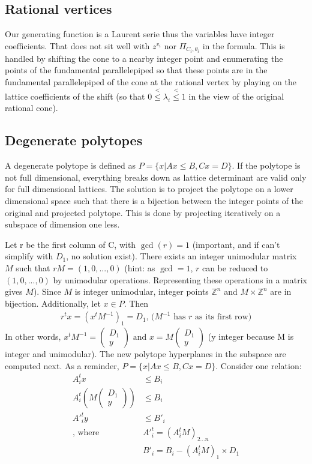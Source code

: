 \documentclass[14pt]{article}
\newcommand{\Z}{\mathbb{Z}}
\newcommand{\ltorle}{\overset{\scriptscriptstyle{<}}{\scriptscriptstyle{\le}}}
\begin{document}
\subsection*{Rational vertices}
Our generating function is a Laurent serie thus the variables have integer coefficients. That does not sit well with $z^{v_i}$ nor $\Pi_{C_i,\theta_i}$ in the formula.
This is handled by shifting the cone to a nearby integer point and enumerating the points of the fundamental parallelepiped so that these points are in the fundamental parallelepiped of the cone at the rational vertex by playing on the lattice coefficients of the shift (so that $0\ltorle \lambda_i \ltorle1$ in the view of the original rational cone).


\subsection*{Degenerate polytopes}

A degenerate polytope is defined as $P = \{x | Ax \le B, Cx = D\}$. If the polytope is not full dimensional, everything breaks down as lattice determinant are valid only for full dimensional lattices.
The solution is to project the polytope on a lower dimensional space such that there is a bijection between the integer points of the original and projected polytope.
This is done by projecting iteratively on a subspace of dimension one less.

Let r be the first column of C, with $\gcd(r) = 1$ (important, and if can't simplify with $D_1$, no solution exist). There exists an integer unimodular matrix $M$ such that $rM = (1,0,...,0)$ (hint: as $\gcd = 1$, $r$ can be reduced to $(1,0,...,0)$ by unimodular operations. Representing these operations in a matrix gives $M$).
Since $M$ is integer unimodular, integer points $\Z^n$ and $M \times \Z^n$ are in bijection. Additionally, let $x \in P$.
Then 
\begin{align*}
  r^t x = (x^t M^{-1})_1 = D_1 \text{, ($M^{-1}$ has $r$ as its first row)}
\end{align*}
In other words, $x^t M^{-1} = \begin{pmatrix}D_1 \\  y\end{pmatrix}\text{ and }x = M \begin{pmatrix}D_1 \\  y\end{pmatrix}$ (y integer because M is integer and unimodular).
The new polytope hyperplanes in the subspace are computed next. As a reminder, $P = \{x | Ax \le B, Cx = D\}$.
Consider one relation: 
\begin{align*}
  A_i^t x & \le B_i  \\
  A_i^t \left(M \begin{pmatrix}D_1 \\ y\end{pmatrix}\right) &\le B_i\\
  A\prime^t_i y &\le B\prime_i\\
   \text{, where } & A\prime^t_i = (A_i^t M)_{2...n}\\ 
  &B\prime_i = B_i - (A_i^t M)_1 \times D_1
\end{align*}
\end{document}
